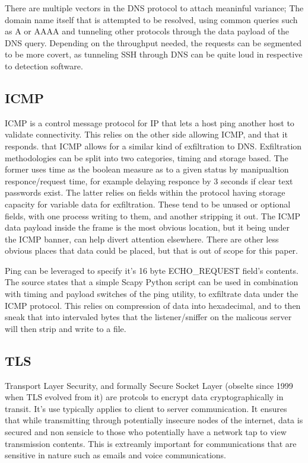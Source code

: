 There are multiple vectors in the DNS protocol to attach meaninful variance; 
The domain name itself that is attempted to be resolved, using common queries such as A or AAAA and tunneling other protocols 
through the data payload of the DNS query. Depending on the throughput needed, the requests can be segmented to be more covert, as tunneling 
SSH through DNS can be quite loud in respective to detection software. \citep{DNSExfiltration}


\subsection{ICMP}
ICMP is a control message protocol for IP that lets a host ping another host to validate connectivity. This relies on the other side allowing ICMP, and that it responds. that ICMP allows for a similar kind of exfiltration to DNS. Exfiltration methodologies can be split into two categories, timing and storage based. The former uses time as the boolean measure as to a given status by manipualtion responce/request time, for example delaying responce by 3 seconds if clear text passwords exist.
The latter relies on fields within the protocol having storage capacity for variable data for exfiltration. These tend to be unused or optional fields, with one process writing to them, and another stripping it out. The ICMP data payload inside the frame is the most obvious location, but it being under the ICMP banner, can help divert attention elsewhere. There are other less obvious places that data could be placed, but that is out of scope for this paper. \citep{ICMPExfiltration}

Ping can be leveraged to specify it's 16 byte ECHO\_REQUEST field's contents. The source states that a simple Scapy Python script can be used in combination with timing and payload switches of the ping utility, to exfiltrate data under the ICMP protocol. This relies on compression of data into hexadecimal, and to then sneak that into intervaled bytes that the listener/sniffer on the malicous server will then strip and write to a file. \citep{pingExfil}



\subsection{TLS}
Transport Layer Security, and formally Secure Socket Layer (obselte since 1999 when TLS evolved from it) are protcols to encrypt data cryptographically in transit. It's use typically applies to client to server communication. It ensures that while transmitting through potentially insecure nodes of the internet, data is secured and non sensicle to those who potentially have a network tap to view transmission contents. This is extreamly important for communications that are sensitive in nature such as emails and voice communications. \citep{CloudflareTLS}

